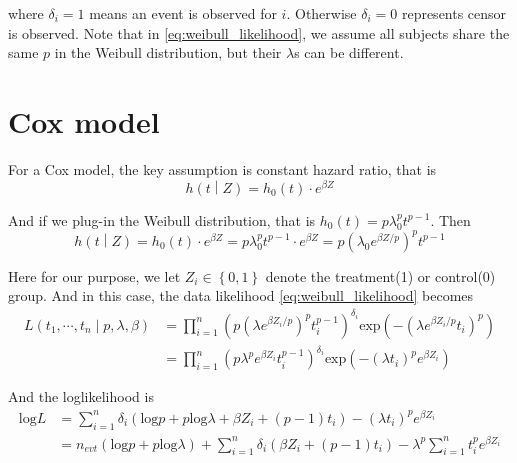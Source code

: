 \documentclass[a4paper,12pt]{article}
\begin{document}
where $\delta_i = 1$ means an event is observed for $i$. Otherwise $\delta_i = 0$ represents censor is observed. Note that in \eqref{eq:weibull_likelihood}, we assume all subjects share the same $p$ in the Weibull distribution, but their $\lambda$s can be different. 



\section{Cox model}
\label{sec:cox-model}

For a Cox model, the key assumption is constant hazard ratio, that is
\[
  h\left(t\middle|Z\right) = h_0\left(t\right)\cdot e^{\beta Z}
\]

And if we plug-in the Weibull distribution, that is $h_0\left(t\right) = p\lambda_0^pt^{p - 1}$. Then
\[
  h\left(t\middle|Z\right)
  = h_0\left(t\right)\cdot e^{\beta Z}
  = p\lambda_0^pt^{p - 1} \cdot e^{\beta Z}
  = p \left(\lambda_0 e^{\beta Z / p}\right)^p t^{p - 1}
\]

Here for our purpose, we let $Z_i \in \left\{0, 1\right\}$ denote the treatment(1) or control(0) group. And in this case, the data likelihood \eqref{eq:weibull_likelihood} becomes
\[
  \begin{aligned}
    L\left(t_1, \cdots, t_n\middle| p, \lambda, \beta\right)
    &= \prod\limits_{i = 1}^n
    \left(p \left(\lambda e^{\beta Z_i/p}\right)^pt_i^{p - 1}\right)^{\delta_i}
    \mathrm{exp}\left(-\left(\lambda e^{\beta Z_i/p} t_i\right)^p\right)    \\
    &= \prod\limits_{i = 1}^n
    \left(p \lambda^p e^{\beta Z_i} t_i^{p - 1}\right)^{\delta_i}
    \mathrm{exp}\left(-\left(\lambda t_i\right)^p e^{\beta Z_i}\right)
  \end{aligned}
\]

And the loglikelihood is
\begin{equation}
  \label{eq:weibull_loglikelihood}
  \begin{aligned}
    \mathrm{log}L
    &= \sum\limits_{i = 1}^n
      \delta_i\left(
      \mathrm{log}p + p\mathrm{log}\lambda + \beta Z_i + \left(p - 1\right)t_i
      \right)
      - \left(\lambda t_i\right)^p e^{\beta Z_i}    \\
    &= n_{evt}\left(\mathrm{log}p + p \mathrm{log}\lambda\right)
      + \sum\limits_{i = 1}^n\delta_i\left(\beta Z_i + \left(p - 1\right)t_i\right)
      - \lambda^p\sum\limits_{i = 1}^nt_i^pe^{\beta Z_i}
  \end{aligned}
\end{equation}
\end{document}
